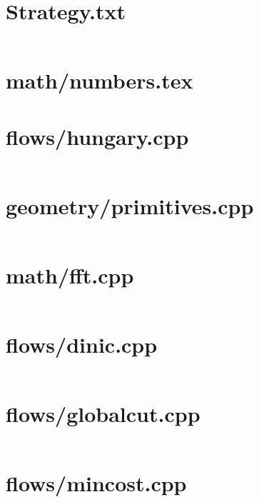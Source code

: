 
\newpage
\section*{Strategy.txt}
\fontsize{10}{12}\selectfont
\inputminted[breaklines]{html}{Strategy.txt}

\newpage
\section{math/numbers.tex}
\fontsize{10}{12}\selectfont


\newpage
\section{flows/hungary.cpp}
\fontsize{7.9}{8.5}\selectfont
\inputminted[numbersep=1pt,linenos,breaklines]{c++}{/home/ifsmirnov/olymp/teambook/tmp.qSsNloJNks/tmp.LNxnhnzSSd}

\newpage
\section{geometry/primitives.cpp}
\fontsize{7.9}{8.5}\selectfont
\inputminted[numbersep=1pt,linenos,breaklines]{c++}{/home/ifsmirnov/olymp/teambook/tmp.qSsNloJNks/tmp.QKFpZsgSfH}

\newpage
\section{math/fft.cpp}
\fontsize{7.9}{8.5}\selectfont
\inputminted[numbersep=1pt,linenos,breaklines]{c++}{/home/ifsmirnov/olymp/teambook/tmp.qSsNloJNks/tmp.HewRuRakSr}

\newpage
\section{flows/dinic.cpp}
\fontsize{7.9}{8.5}\selectfont
\inputminted[numbersep=1pt,linenos,breaklines]{c++}{/home/ifsmirnov/olymp/teambook/tmp.qSsNloJNks/tmp.yDl4wONaYI}

\newpage
\section{flows/globalcut.cpp}
\fontsize{7.9}{8.5}\selectfont
\inputminted[numbersep=1pt,linenos,breaklines]{c++}{algo/flows/globalcut.cpp}

\newpage
\section{flows/mincost.cpp}
\fontsize{7.9}{8.5}\selectfont
\inputminted[numbersep=1pt,linenos,breaklines]{c++}{/home/ifsmirnov/olymp/teambook/tmp.qSsNloJNks/tmp.j6mEzLJ1me}

